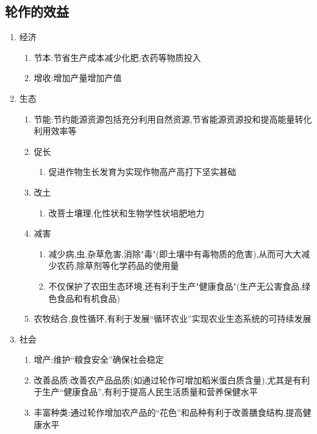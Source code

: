 \documentclass[a4paper]{article}
\begin{document}
    \subsection{轮作的效益}
    \begin{enumerate}
        \item 经济
        \begin{enumerate}
            \item 节本:节省生产成本减少化肥,衣药等物质投入
            \item 增收:增加产量增加产值
        \end{enumerate}
        \item 生态
        \begin{enumerate}
            \item 节能:节约能源资源包括充分利用自然资源,节省能源资源投和提高能量转化利用效率等
            \item 促长
            \begin{enumerate}
                \item 促进作物生长发育为实现作物高产高打下坚实甚础
            \end{enumerate}
            \item 改土
            \begin{enumerate}
                \item 改菩士壤理,化性状和生物学性状培肥地力
            \end{enumerate}
            \item 减害
            \begin{enumerate}
                \item 减少病,虫,杂草危害,消除"毒"(即土壤中有毒物质的危害),从而可大大减少农药,除草剂等化学药品的使用量
                \item 不仅保护了农田生态环境,还有利于生产"健康食品"(生产无公害食品,绿色食品和有机食品)
            \end{enumerate}
            \item 农牧结合,良性循环,有利于发展“循环农业”实现农业生态系统的可持续发展
        \end{enumerate}
        \item 社会
        \begin{enumerate}
            \item 增产:维护“粮食安全”确保社会稳定
            \item 改善品质:改善农产品品质(如通过轮作可增加稻米蛋白质含量),尤其是有利于生产“健康食品”,有利于提高人民生活质量和营养保健水平
            \item 丰富种类:通过轮作增加农产品的“花色”和品种有利于改善膳食结构,提高健康水平
        \end{enumerate}
    \end{enumerate}
\end{document}
